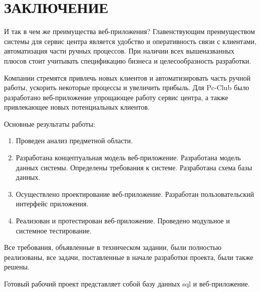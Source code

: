 \section*{ЗАКЛЮЧЕНИЕ}

И так в чем же преимущества веб-приложения? Главенствующим преимуществом системы для сервис центра является удобство и оперативность связи с клиентами, автоматизация части ручных процессов. При наличии всех вышеназванных плюсов стоит учитывать спецификацию бизнеса и целесообразность разработки.
  
Компании стремятся привлечь новых клиентов и автоматизировать часть ручной работы, ускорить некоторые процессы и увеличить прибыль. Для Pc-Club было разработано веб-приложение упрощающее работу сервис центра, а также привлекающее новых потенциальных клиентов.

Основные результаты работы:

\begin{enumerate}
\item Проведен анализ предметной области.
\item Разработана концептуальная модель веб-приложение. Разработана модель данных системы. Определены требования к системе. Разработана схема базы данных.
\item Осуществлено проектирование веб-приложение. Разработан пользовательский интерфейс приложения.
\item Реализован и протестирован веб-приложение. Проведено модульное и системное тестирование.
\end{enumerate}

Все требования, объявленные в техническом задании, были полностью реализованы, все задачи, поставленные в начале разработки проекта, были также решены.

Готовый рабочий проект представляет собой базу данных sql и веб-приложение.